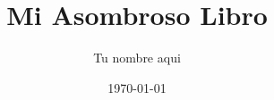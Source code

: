 \documentclass[]{article}
\begin{document}
\title{\bf Mi Asombroso Libro}          
\author{Tu nombre aqui}                        
\date{\today} 

\maketitle 
\end{document}

